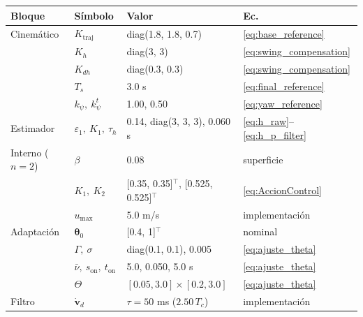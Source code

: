\begin{tabular}{llll}
\toprule
Bloque & S\'imbolo & Valor & Ec. \\
\midrule
Cinem\'atico & $K_{\mathrm{traj}}$ & diag(1.8, 1.8, 0.7) & \eqref{eq:base_reference} \\
 & $K_h$ & diag(3, 3) & \eqref{eq:swing_compensation} \\
 & $K_{dh}$ & diag(0.3, 0.3) & \eqref{eq:swing_compensation} \\
 & $T_s$ & 3.0 s & \eqref{eq:final_reference} \\
 & $k_\psi,\ k_\psi^t$ & 1.00, 0.50 & \eqref{eq:yaw_reference} \\
Estimador & $\varepsilon_1,\ K_1,\ \tau_h$ & 0.14, diag(3, 3, 3), 0.060 s & \eqref{eq:h_raw}--\eqref{eq:h_p_filter} \\
Interno ($n=2$) & $\beta$ & 0.08 & superficie \\
 & $K_1,\ K_2$ & [0.35, 0.35]$^\top$, [0.525, 0.525]$^\top$ & \eqref{eq:AccionControl} \\
 & $u_{\max}$ & 5.0 m/s & implementaci\'on \\
Adaptaci\'on & $\boldsymbol{\theta}_0$ & [0.4, 1]$^\top$ & nominal \\
 & $\Gamma,\ \sigma$ & diag(0.1, 0.1), 0.005 & \eqref{eq:ajuste_theta} \\
 & $\bar\nu,\ s_{\mathrm{on}},\ t_{\mathrm{on}}$ & 5.0, 0.050, 5.0 s & \eqref{eq:ajuste_theta} \\
 & $\Theta$ & $[0.05,3.0]\times[0.2,3.0]$ & \eqref{eq:ajuste_theta} \\
Filtro & $\dot{\mathbf{v}}_d$ & $\tau = 50$ ms ($2.50\,T_c$) & implementaci\'on \\
\bottomrule
\end{tabular}
